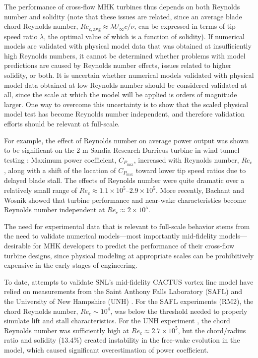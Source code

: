 \documentclass[10pt,letterpaper]{article}
\begin{document}
The performance of cross-flow MHK turbines thus depends on both Reynolds number
and solidity (note that these issues are related, since an average blade chord
Reynolds number, $Re_{c,\mathrm{avg}} \approx \lambda U_\infty c/ \nu$, can be
expressed in terms of tip speed ratio $\lambda$, the optimal value of which is a
function of solidity). If numerical models are validated with physical model
data that was obtained at insufficiently high Reynolds numbers, it cannot be
determined whether problems with model predictions are caused by Reynolds number
effects, issues related to higher solidity, or both. It is uncertain whether
numerical models validated with physical model data obtained at low Reynolds
number should be considered validated at all, since the scale at which the model
will be applied is orders of magnitude larger. One way to overcome this
uncertainty is to show that the scaled physical model test has become Reynolds
number independent, and therefore validation efforts should be relevant at
full-scale.

For example, the effect of Reynolds number on average power output was shown to
be significant on the 2 m Sandia Research Darrieus turbine in wind tunnel
testing \cite{Blackwell1976}: Maximum power coefficient, $C_{P_{\max}}$,
increased with Reynolds number, $Re_c$, along with a shift of the location of
$C_{P_{\max}}$ toward lower tip speed ratios due to delayed blade stall. The
effects of Reynolds number were quite dramatic over a relatively small range of
$Re_c \approx 1.1 \times 10^5$--$2.9 \times 10^5$. More recently, Bachant and
Wosnik \cite{Bachant2014, Bachant2015-RVAT-Re-dep} showed that turbine
performance and near-wake characteristics become Reynolds number independent at
$Re_c \approx 2 \times 10^5$.

The need for experimental data that is relevant to full-scale behavior stems
from the need to validate numerical models---most importantly mid-fidelity
models---desirable for MHK developers to predict the performance of their
cross-flow turbine designs, since physical modeling at appropriate scales can be
prohibitively expensive in the early stages of engineering.

To date, attempts to validate SNL's mid-fidelity CACTUS vortex line model
\cite{Murray2011} have relied on measurements from the Saint Anthony Falls
Laboratory (SAFL) \cite{Hill2014} and the University of New Hampshire (UNH)
\cite{Neary2013, Michelen2014}. For the SAFL experiments (RM2), the chord
Reynolds number, $Re_c \sim 10^4$, was below the threshold needed to properly
simulate lift and stall characteristics. For the UNH experiment
\cite{Bachant2013}, the chord Reynolds number was sufficiently high at $Re_c
\approx 2.7 \times 10^5$, but the chord/radius ratio and solidity (13.4\%)
created instability in the free-wake evolution in the model, which caused
significant overestimation of power coefficient.
\end{document}
